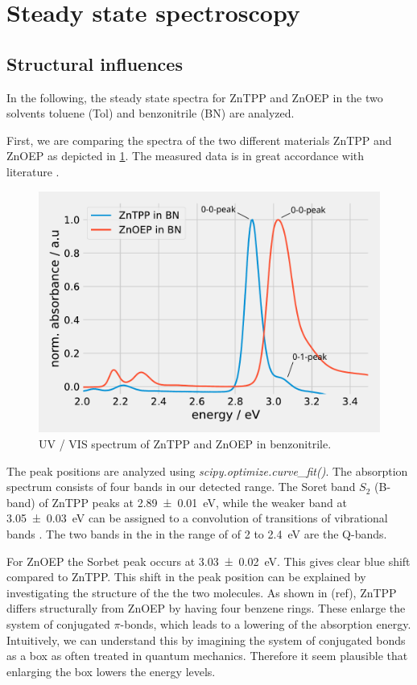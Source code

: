 \section{Steady state spectroscopy}
\label{sec:SSS}

\subsection{Structural influences}

In the following, the steady state spectra for ZnTPP and ZnOEP in the two solvents toluene (Tol) and benzonitrile (BN) are analyzed.

First, we are comparing the spectra of the two different materials ZnTPP and ZnOEP as depicted in \cref{fig:ZnTPPZnOEP}. The measured data is in great accordance with 
literature \cite{Wagner.1994}.
\begin{figure}[h]
    \centering
    \includegraphics[width = 12cm]{Program/ZnTPPZnOEP.pdf}
    \caption{UV / VIS spectrum of ZnTPP and ZnOEP in benzonitrile.}
    \label{fig:ZnTPPZnOEP}
\end{figure}
The peak positions are analyzed using \textit{scipy.optimize.curve\_fit()}. The absorption spectrum consists of four bands in our detected range. The Soret band $S_\mathrm{2}$ (B-band) of ZnTPP peaks at 
\SI{2.89 \pm 0.01}{\eV}, while the weaker band at \SI{3.05\pm0.03}{\eV} can be assigned to a convolution of transitions of vibrational bands \cite{Even.1982}.
The two bands in the in the range of of 2 to \SI{2.4}{\eV} are the Q-bands. 

For ZnOEP the Sorbet peak occurs at \SI{3.03\pm 0.02}{\eV}. This gives clear blue shift compared to ZnTPP.
This shift in the peak position can be explained by investigating the structure of the the two molecules. As shown in (ref), ZnTPP differs structurally from ZnOEP by having four benzene rings.
These enlarge the system of conjugated $\pi$-bonds, which leads to a lowering of the absorption energy\cite{Kohler.2015}. Intuitively, we can
understand this by imagining the system of conjugated bonds as a box as often treated in quantum mechanics.
Therefore it seem plausible that enlarging the box lowers the energy levels.


